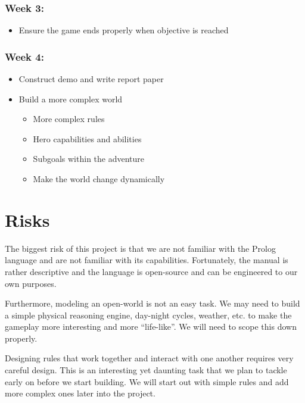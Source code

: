 \documentclass[10pt]{article}
\begin{document}
\subsubsection*{Week 3:}

\begin{itemize}
\item Ensure the game ends properly when objective is reached
\end{itemize}


\subsubsection*{Week 4:}

\begin{itemize}
\item Construct demo and write report paper
\item Build a more complex world
    \begin{itemize}
    \item More complex rules
    \item Hero capabilities and abilities
    \item Subgoals within the adventure
    \item Make the world change dynamically
    \end{itemize}
\end{itemize}



\section{Risks}

The biggest risk of this project is that we are not familiar with the Prolog language and are not familiar with its capabilities. Fortunately, the manual is rather descriptive and the language is open-source and can be engineered to our own purposes.

Furthermore, modeling an open-world is not an easy task. We may need to build a simple physical reasoning engine, day-night cycles, weather, etc. to make the gameplay more interesting and more “life-like”. We will need to scope this down properly.

Designing rules that work together and interact with one another requires very careful design. This is an interesting yet daunting task that we plan to tackle early on before we start building. We will start out with simple rules and add more complex ones later into the project.
\end{document}
